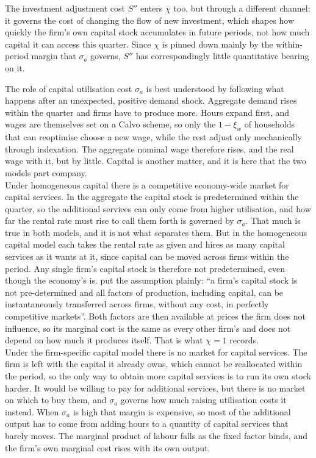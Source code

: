 \documentclass[12pt, a4paper]{article}
\begin{document}
The investment adjustment cost $S''$ enters $\chi$ too, but through a different channel: 
it governs the cost of changing the flow of new investment, which shapes how quickly the 
firm's own capital stock accumulates in future periods, not how much capital it can access this quarter. 
Since $\chi$ is pinned down mainly by the within-period margin that $\sigma_a$ governs, $S''$ 
has correspondingly little quantitative bearing on it.

The role of capital utilisation cost $\sigma_a$ is best understood by following what happens after an unexpected,
positive demand shock. Aggregate demand rises within the quarter and firms have to produce
more. Hours expand first, and wages are themselves set on a Calvo scheme, so only the
$1-\xi_w$ of households that can reoptimise choose a new wage, while the rest adjust only
mechanically through indexation. The aggregate nominal wage therefore rises, and the real
wage with it, but by little. Capital is another matter, and it is here that the two models
part company.
\\

Under homogeneous capital there is a competitive economy-wide market for capital services.
In the aggregate the capital stock is predetermined within the quarter, so the additional
services can only come from higher utilisation, and how far the rental rate must rise to call
them forth is governed by $\sigma_a$. That much is true in both models, and it is not what
separates them. But in the homogeneous capital model each takes the rental rate as given and hires as many capital services as it
wants at it, since capital can be moved across firms within the period. Any single firm's
capital stock is therefore not predetermined, even though the economy's is.
\citet[p.~2]{ACEL2005WP} put the assumption plainly: ``a firm's capital stock is not
pre-determined and all factors of production, including capital, can be instantaneously
transferred across firms, without any cost, in perfectly competitive markets''. Both factors
are then available at prices the firm does not influence, so its marginal cost is the same as
every other firm's and does not depend on how much it produces itself. That is what
$\chi = 1$ records.
\\

Under the firm-specific capital model there is no market for capital services. The firm is left with
the capital it already owns, which cannot be reallocated within the period, so the only way
to obtain more capital services is to run its own stock harder. It would be willing to pay for additional services, but there is no market on which to buy
them, and $\sigma_a$ governs how much raising utilisation costs it instead. When $\sigma_a$ is high that margin is expensive, so
most of the additional output has to come from adding hours to a quantity of capital services
that barely moves. The marginal product of labour falls as the fixed factor binds, and the
firm's own marginal cost rises with its own output.
\\
\end{document}
